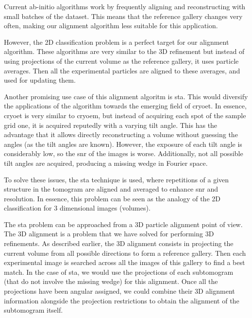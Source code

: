 \documentclass[../main.tex]{subfiles}
\begin{document}
Current ab-initio algorithms work by frequently aligning and reconstructing with small batches of the dataset. This means that the reference gallery changes very often, making our alignment algorithm less suitable for this application.

However, the 2D classification problem is a perfect target for our alignment algorithm. These algorithms are very similar to the 3D refinement but instead of using projections of the current volume as the reference gallery, it uses particle averages. Then all the experimental particles are aligned to these averages, and used for updating them.

Another promising use case of this alignment algoritm is \gls{sta}. This would diversify the applications of the algorithm towards the emerging field of \gls{cryoet}. In essence, \gls{cryoet} is very similar to \gls{cryoem}, but instead of acquiring each spot of the sample grid one, it is acquired reputedly with a varying tilt angle. This has the advantage that it allows directly reconstructing a volume without guessing the angles (as the tilt angles are known). However, the exposure of each tilt angle is considerably low, so the \gls{snr} of the images is worse. Additionally, not all possible tilt angles are acquired, producing a missing wedge in Fourier space.

To solve these issues, the \gls{sta} technique is used, where repetitions of a given structure in the tomogram are aligned and averaged to enhance \gls{snr} and resolution. In essence, this problem can be seen as the analogy of the 2D classification for 3 dimensional images (volumes).

The \gls{sta} problem can be approached from a 3D particle alignment point of view. The 3D alignment is a problem that we have solved for performing 3D refinements. As described earlier, the 3D alignment consists in projecting the current volume from all possible directions to form a reference gallery. Then each experimental image is searched across all the images of this gallery to find a best match. In the case of \gls{sta}, we would use the projections of each subtomogram (that do not involve the missing wedge) for this alignment. Once all the projections have been angular assigned, we could combine their 3D alignment information alongside the projection restrictions to obtain the alignment of the subtomogram itself.
\end{document}
